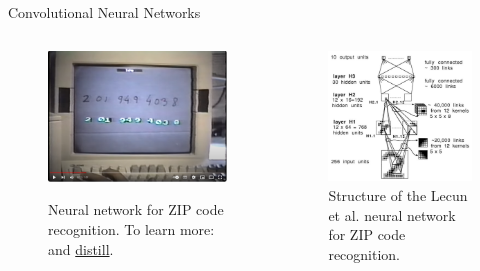 \documentclass{beamer}
\begin{document}
\begin{frame}[fragile]{Convolutional Neural Networks}
    \begin{columns}
        \begin{column}{0.4\linewidth}  
            \begin{figure}
                \href{https://www.youtube.com/watch?v=FwFduRA_L6Q}{\includegraphics[width=0.9\linewidth]{CNNvideo}}
                \caption{Neural network for ZIP code recognition. To learn more: \cite{Olah_2014} and \href{https://distill.pub/}{distill}.}
                \label{Fig:CNNvideo}
            \end{figure}
        \end{column}
        \begin{column}{0.6\linewidth}
            \begin{figure}
                \includegraphics[width=0.9\linewidth]{CNN}
                \caption{Structure of the Lecun et al. neural network for ZIP code recognition\cite{lecun_backpropagation_1989}.}
                \label{Fig:CNN}
            \end{figure}
        \end{column}
     \end{columns}
\end{frame}
\end{document}
